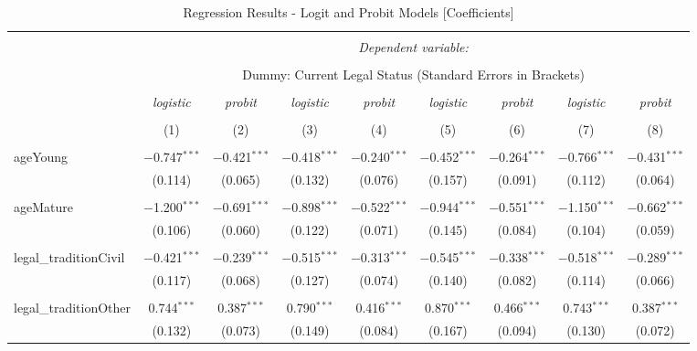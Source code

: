 \documentclass[a4paper,nobind]{templates/ociamthesis}
\begin{document}
\begin{landscape}
\begin{table}[!htbp] \centering 
  \caption{Regression Results - Logit and Probit Models [Coefficients]} 
  \label{} 
\footnotesize 
\begin{tabular}{@{\extracolsep{5pt}}lcccccccc} 
\\[-1.8ex]\hline 
\hline \\[-1.8ex] 
 & \multicolumn{8}{c}{\textit{Dependent variable:}} \\ 
\cline{2-9} 
\\[-1.8ex] & \multicolumn{8}{c}{Dummy: Current Legal Status (Standard Errors in Brackets)} \\ 
\\[-1.8ex] & \textit{logistic} & \textit{probit} & \textit{logistic} & \textit{probit} & \textit{logistic} & \textit{probit} & \textit{logistic} & \textit{probit} \\ 
\\[-1.8ex] & (1) & (2) & (3) & (4) & (5) & (6) & (7) & (8)\\ 
\hline \\[-1.8ex] 
 ageYoung & $-$0.747$^{***}$ & $-$0.421$^{***}$ & $-$0.418$^{***}$ & $-$0.240$^{***}$ & $-$0.452$^{***}$ & $-$0.264$^{***}$ & $-$0.766$^{***}$ & $-$0.431$^{***}$ \\ 
  & (0.114) & (0.065) & (0.132) & (0.076) & (0.157) & (0.091) & (0.112) & (0.064) \\ 
  & & & & & & & & \\ 
 ageMature & $-$1.200$^{***}$ & $-$0.691$^{***}$ & $-$0.898$^{***}$ & $-$0.522$^{***}$ & $-$0.944$^{***}$ & $-$0.551$^{***}$ & $-$1.150$^{***}$ & $-$0.662$^{***}$ \\ 
  & (0.106) & (0.060) & (0.122) & (0.071) & (0.145) & (0.084) & (0.104) & (0.059) \\ 
  & & & & & & & & \\ 
 legal\_traditionCivil & $-$0.421$^{***}$ & $-$0.239$^{***}$ & $-$0.515$^{***}$ & $-$0.313$^{***}$ & $-$0.545$^{***}$ & $-$0.338$^{***}$ & $-$0.518$^{***}$ & $-$0.289$^{***}$ \\ 
  & (0.117) & (0.068) & (0.127) & (0.074) & (0.140) & (0.082) & (0.114) & (0.066) \\ 
  & & & & & & & & \\ 
 legal\_traditionOther & 0.744$^{***}$ & 0.387$^{***}$ & 0.790$^{***}$ & 0.416$^{***}$ & 0.870$^{***}$ & 0.466$^{***}$ & 0.743$^{***}$ & 0.387$^{***}$ \\ 
  & (0.132) & (0.073) & (0.149) & (0.084) & (0.167) & (0.094) & (0.130) & (0.072) \\ 

\end{tabular}
\end{table}
\end{landscape}
\end{document}
